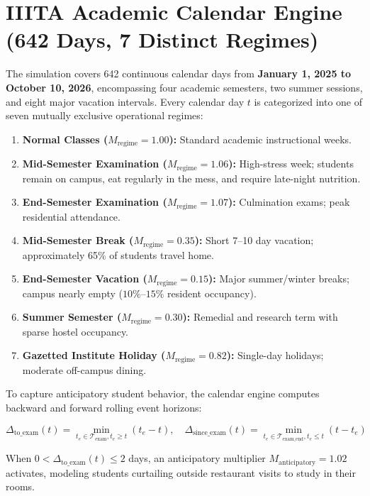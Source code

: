 \documentclass[11pt,a4paper,oneside]{report}
\begin{document}
\section{IIITA Academic Calendar Engine (642 Days, 7 Distinct Regimes)}
The simulation covers 642 continuous calendar days from \textbf{January 1, 2025 to October 10, 2026}, encompassing four academic semesters, two summer sessions, and eight major vacation intervals. Every calendar day $t$ is categorized into one of seven mutually exclusive operational regimes:
\begin{enumerate}
  \item \textbf{Normal Classes ($M_{\text{regime}} = 1.00$):} Standard academic instructional weeks.
  \item \textbf{Mid-Semester Examination ($M_{\text{regime}} = 1.06$):} High-stress week; students remain on campus, eat regularly in the mess, and require late-night nutrition.
  \item \textbf{End-Semester Examination ($M_{\text{regime}} = 1.07$):} Culmination exams; peak residential attendance.
  \item \textbf{Mid-Semester Break ($M_{\text{regime}} = 0.35$):} Short 7--10 day vacation; approximately 65\% of students travel home.
  \item \textbf{End-Semester Vacation ($M_{\text{regime}} = 0.15$):} Major summer/winter breaks; campus nearly empty ($10\%\text{--}15\%$ resident occupancy).
  \item \textbf{Summer Semester ($M_{\text{regime}} = 0.30$):} Remedial and research term with sparse hostel occupancy.
  \item \textbf{Gazetted Institute Holiday ($M_{\text{regime}} = 0.82$):} Single-day holidays; moderate off-campus dining.
\end{enumerate}

To capture anticipatory student behavior, the calendar engine computes backward and forward rolling event horizons:
\begin{mathformulationbox}
$$\Delta_{\text{to\_exam}}(t) = \min_{t_e \in \mathcal{T}_{\text{exam}}, t_e \ge t} (t_e - t), \quad \Delta_{\text{since\_exam}}(t) = \min_{t_e \in \mathcal{T}_{\text{exam\_end}}, t_e \le t} (t - t_e)$$
\end{mathformulationbox}
When $0 < \Delta_{\text{to\_exam}}(t) \le 2$ days, an anticipatory multiplier $M_{\text{anticipatory}} = 1.02$ activates, modeling students curtailing outside restaurant visits to study in their rooms.
\end{document}
